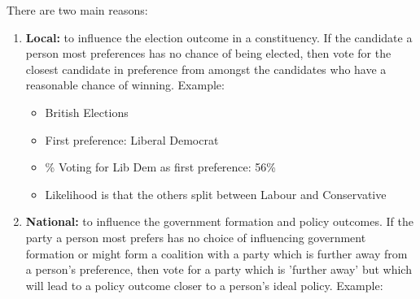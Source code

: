\documentclass[12pt, letterpaper]{article}
\begin{document}
There are two main reasons:
\begin{enumerate}
	\item \textbf{Local:} to influence the election outcome in a constituency. If the candidate a person most preferences has no chance of being elected, then vote for the closest candidate in preference from amongst the candidates who have a reasonable chance of winning. Example:
		\begin{itemize}
			\item British Elections
			\item First preference: Liberal Democrat
			\item \% Voting for Lib Dem as first preference: 56\%
			\item Likelihood is that the others split between Labour and Conservative
		\end{itemize}
	\item \textbf{National:} to influence the government formation and policy outcomes. If the party a person most prefers has no choice of influencing government formation or might form a coalition with a party which is further away from a person's preference, then vote for a party which is 'further away' but which will lead to a policy outcome closer to a person's ideal policy. Example:\\
	\begin{center}
	\end{center}
	

\end{enumerate}
\end{document}
